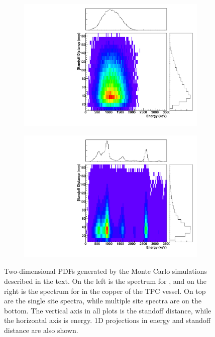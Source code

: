 \documentclass[herrin-thesis.tex]{subfiles}
\begin{document}
\begin{figure}[htbp]
\begin{subfigure}[b]{0.48\textwidth}
	\end{subfigure}
	\begin{subfigure}[b]{0.48\textwidth}
	\centering
	\includegraphics[width=\textwidth]{./plots/PDFs/analysis_pdf_bb2n_ms.pdf}
	\end{subfigure}\hfill%
	\begin{subfigure}[b]{0.48\textwidth}
	\centering
	\includegraphics[width=\textwidth]{./plots/PDFs/analysis_pdf_AllVessel_Th232_ms.pdf}
	\end{subfigure}
\caption[Examples of 2D PDFs]{Two-dimensional PDFs generated by the Monte Carlo simulations described in the text. On the left is the spectrum for \twonu{}, and on the right is the spectrum for  in the copper of the TPC vessel. On top are the single site spectra, while multiple site spectra are on the bottom. The vertical axis in all plots is the standoff distance, while the horizontal axis is energy. 1D projections in energy and standoff distance are also shown.}
\label{fig:analysis_example_PDFs}
\end{figure}
\end{document}
